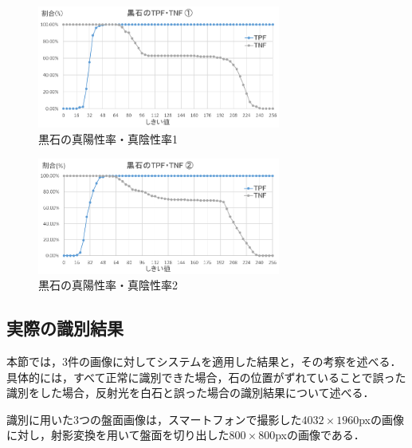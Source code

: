 \documentclass[openright]{nitocs}
\numberwithin{equation}{section}
\begin{document}
            \begin{figure}[tb] %
                \begin{center}
                \includegraphics[clip,width=80mm]{Case1_Black_TPF_TNF.eps} 
                \caption{黒石の真陽性率・真陰性率1}
                \label{Case1Black}
                \end{center}
            \end{figure}

            \begin{figure}[tb] %
                \begin{center}
                \includegraphics[clip,width=80mm]{Case2_Black_TPF_TNF.eps} 
                \caption{黒石の真陽性率・真陰性率2}
                \label{Case2Black}
                \end{center}
            \end{figure}

        \subsection{実際の識別結果} %
        \label{identify_result}
            本節では，3件の画像に対してシステムを適用した結果と，その考察を述べる．
            具体的には，すべて正常に識別できた場合，石の位置がずれていることで誤った識別をした場合，反射光を白石と誤った場合の識別結果について述べる．

            識別に用いた3つの盤面画像は，スマートフォンで撮影した$4032\times1960$pxの画像に対し，射影変換を用いて盤面を切り出した$800\times800$pxの画像である．
\end{document}
